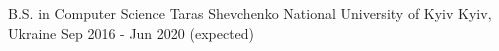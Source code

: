 

\begin{cventries}

  \cventry
    {B.S. in Computer Science} %
    {Taras Shevchenko National University of Kyiv} %
    {Kyiv, Ukraine} %
    {Sep 2016 - Jun 2020 (expected)} %
    {}
\end{cventries}
